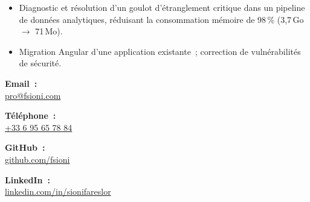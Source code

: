 \documentclass[letterpaper,11pt]{article}
\begin{document}
\begin{cv}[profile][2]
\cvseparator[1]
    \begin{cvevent}[05/2023][08/2023]
        \begin{itemize}
            \item Diagnostic et r\'esolution d'un goulot d'\'etranglement critique dans un pipeline de donn\'ees analytiques, r\'eduisant la consommation m\'emoire de 98\,\% (3,7\,Go $\rightarrow$ 71\,Mo).
            \item Migration Angular d'une application existante~; correction de vuln\'erabilit\'es de s\'ecurit\'e.
        \end{itemize}
    \end{cvevent}

\begin{cvevent}[2023][2025]
\end{cvevent}

\begin{cvevent}[2019][2023]
\end{cvevent}

\cvsidebar

\begin{cvitem}[Envelope][4]
    \textbf{Email~:}\\
    \href{mailto:pro@fsioni.com}{pro@fsioni.com}
\end{cvitem}

\cvseparator[2]
\begin{cvitem}[Phone][4]
    \textbf{T\'el\'ephone~:}\\
    \href{tel:+33695657884}
    {+33 6 95 65 78 84}
\end{cvitem}

\cvseparator[2]
\begin{cvitem}[Github][4]
    \textbf{GitHub~:}\\
    \href{https://github.com/fsioni}{github.com/fsioni}
\end{cvitem}

\cvseparator[2]
\begin{cvitem}[Linkedin][4]
    \textbf{LinkedIn~:}\\
    \href{https://linkedin.com/in/sionifareslor}{linkedin.com/in/sionifareslor}
\end{cvitem}


\end{cv}
\end{document}
